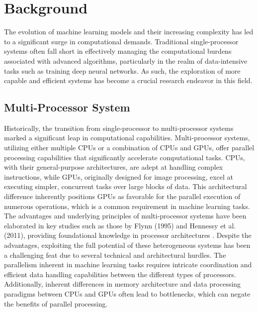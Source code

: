 \documentclass[11.5pt]{article}
\begin{document}
\section{Background}
The evolution of machine learning models and their increasing complexity has led to a significant surge in computational demands. Traditional single-processor systems often fall short in effectively managing the computational burdens associated with advanced algorithms, particularly in the realm of data-intensive tasks such as training deep neural networks. As such, the exploration of more capable and efficient systems has become a crucial research endeavor in this field.

\subsection{Multi-Processor System}
Historically, the transition from single-processor to multi-processor systems marked a significant leap in computational capabilities. 
Multi-processor systems, utilizing either multiple CPUs or a combination of CPUs and GPUs, offer parallel processing capabilities that significantly accelerate computational tasks. CPUs, with their general-purpose architectures, are adept at handling complex instructions, while GPUs, originally designed for image processing, excel at executing simpler, concurrent tasks over large blocks of data.
This architectural difference inherently positions GPUs as favorable for the parallel execution of numerous operations, which is a common requirement in machine learning tasks. 
The advantages and underlying principles of multi-processor systems have been elaborated in key studies such as those by Flynn (1995) and Hennessy et al. (2011), providing foundational knowledge in processor architectures\cite{paper2} \cite{paper3}. 
Despite the advantages, exploiting the full potential of these heterogeneous systems has been a challenging feat due to several technical and architectural hurdles. The parallelism inherent in machine learning tasks requires intricate coordination and efficient data handling capabilities between the different types of processors. Additionally, inherent differences in memory architecture and data processing paradigms between CPUs and GPUs often lead to bottlenecks, which can negate the benefits of parallel processing.
\end{document}
